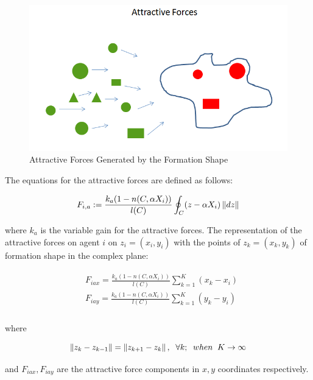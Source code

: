 \begin{figure}[H]
\caption{Attractive Forces Generated by the Formation Shape}
\centering
\includegraphics[scale = 0.60]{attractive_forces}
\end{figure}	

The equations for the attractive forces are defined as follows:			

\begin{equation}
F_{i,a} := \frac{k_a (1-n(C,\alpha X_i))}{l(C)} \oint_C(z-\alpha X_i)\left\lVert dz\right\rVert
\end{equation}

where $k_a$ is the variable gain for the attractive forces. The representation of the attractive forces on agent $i$ on $z_i = (x_i, y_i)$ with the points of  $z_k = (x_k,y_k)$ of formation shape in the complex plane:

\begin{align}
\begin{split}
& F_{iax} =\frac{k_a (1-n(C,\alpha X_i))}{l(C)}  \sum_{k=1}^{K} (x_k  - x_i)\\
& F_{iay} =\frac{k_a (1-n(C,\alpha X_i))}{l(C)}  \sum_{k=1}^{K} (y_k  - y_i)\\
\end{split}
\end{align}
			
where

\begin{equation}
\left\lVert z_k - z_{k-1}\right\rVert = \left\lVert z_{k+1} - z_k\right\rVert, \hspace{0.2cm}  \forall k ;  \hspace{0.2cm} when  \hspace{0.2cm} K \to\infty
\end{equation}
			
and $F_{iax} , F_{iay} $ are the attractive force components in $x,y$ coordinates respectively.\newline
			

